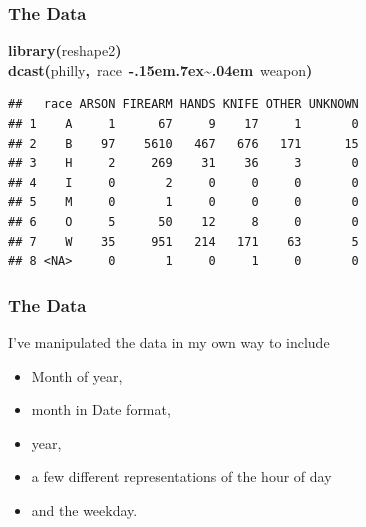 \documentclass[]{beamer}
\makeatletter
\newcommand{\hlfunctioncall}[1]{\textcolor[rgb]{.5,0,.33}{\textbf{#1}}}%
\newcommand{\hlkeyword}[1]{\textbf{#1}}%
\newcommand{\hlsymbol}[1]{#1}%
\def\urltilda{\kern -.15em\lower .7ex\hbox{\~{}}\kern .04em}%
\newcommand{\hlstd}[1]{\textcolor[rgb]{0,0,0}{#1}}%
\newenvironment{kframe}{%
 \def\FrameCommand##1{\hskip\@totalleftmargin \hskip-\fboxsep
 \colorbox{shadecolor}{##1}\hskip-\fboxsep
     \hskip-\linewidth \hskip-\@totalleftmargin \hskip\columnwidth}%
 \MakeFramed {\advance\hsize-\width
   \@totalleftmargin\z@ \linewidth\hsize
   \@setminipage}}%
 {\par\unskip\endMakeFramed}
\newenvironment{knitrout}{}{} %
\renewenvironment{knitrout}{\begin{footnotesize}}{\end{footnotesize}}
\makeatother
\begin{document}
\begin{frame}[fragile]
	\frametitle{The Data}
\begin{knitrout}
\color{fgcolor}\begin{kframe}
\begin{flushleft}
\ttfamily\noindent
\hlfunctioncall{library}\hlkeyword{(}\hlsymbol{reshape2}\hlkeyword{)}\hspace*{\fill}\\
\hlstd{}\hlfunctioncall{dcast}\hlkeyword{(}\hlsymbol{philly}\hlkeyword{,}{\ }\hlsymbol{race}{\ }\hlkeyword{\urltilda{}}{\ }\hlsymbol{weapon}\hlkeyword{)}\mbox{}
\normalfont
\end{flushleft}
\begin{verbatim}
##   race ARSON FIREARM HANDS KNIFE OTHER UNKNOWN
## 1    A     1      67     9    17     1       0
## 2    B    97    5610   467   676   171      15
## 3    H     2     269    31    36     3       0
## 4    I     0       2     0     0     0       0
## 5    M     0       1     0     0     0       0
## 6    O     5      50    12     8     0       0
## 7    W    35     951   214   171    63       5
## 8 <NA>     0       1     0     1     0       0
\end{verbatim}
\end{kframe}
\end{knitrout}

\end{frame}
















\begin{frame}[fragile]
	\frametitle{The Data}
	
	I've manipulated the data in my own way to include
	\begin{itemize}
		\item Month of year,
		\item month in Date format,
		\item year,
		\item a few different representations of the hour of day
		\item and the weekday.
	\end{itemize}
\end{frame}
\end{document}
